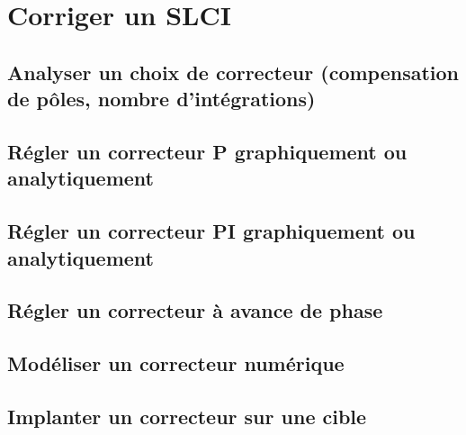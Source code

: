 \setchapterpreamble[u]{\margintoc} 
\chapter{Corriger un SLCI} 
\section{Analyser un choix de correcteur (compensation de pôles, nombre d'intégrations)} 
\section{Régler un correcteur P graphiquement ou analytiquement} 
\graphicspath{{\repStyle/png/}{../COR/COR-02-P/65_Eclipse/images/}} 
 
 
\section{Régler un correcteur PI graphiquement ou analytiquement} 
\graphicspath{{\repStyle/png/}{../COR/COR-03-PI/65_Eclipse_02/images/}} 
 
 
\graphicspath{{\repStyle/png/}{../COR/COR-03-PI/66_Micromanipulateur/images/}} 
 
 
\graphicspath{{\repStyle/png/}{../COR/COR-03-PI/67_PompeTurbo/images/}} 
 
 
\graphicspath{{\repStyle/png/}{../COR/COR-03-PI/68_Roburoc/images/}} 
 
 
\graphicspath{{\repStyle/png/}{../COR/COR-03-PI/70_Hublex/images/}} 
 
 
\section{Régler un correcteur à avance de phase} 
\graphicspath{{\repStyle/png/}{../COR/COR-04-AP/65_Eclipse_03/images/}} 
 
 
\section{Modéliser un correcteur numérique} 
\section{Implanter un correcteur sur une cible} 
